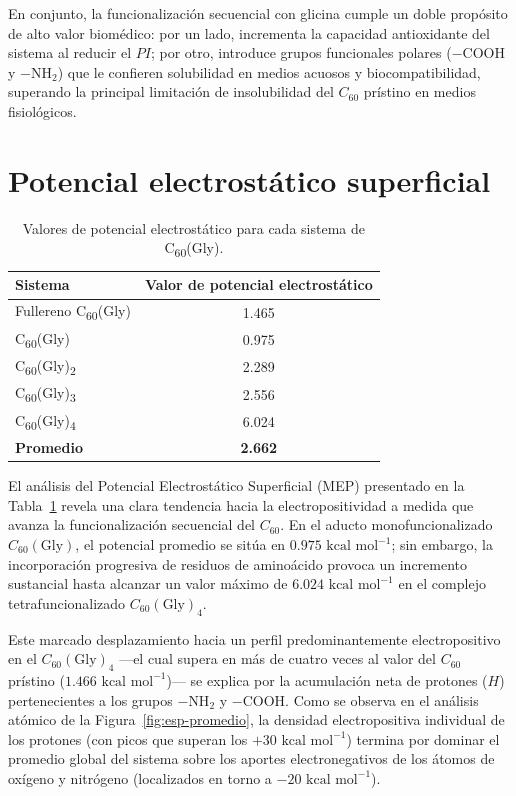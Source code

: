 En conjunto, la funcionalización secuencial con glicina cumple un doble propósito de alto valor biomédico: por un lado, incrementa la capacidad antioxidante del sistema al reducir el $PI$; por otro, introduce grupos funcionales polares ($-\text{COOH}$ y $-\text{NH}_2$) que le confieren solubilidad en medios acuosos y biocompatibilidad, superando la principal limitación de insolubilidad del $C_{60}$ prístino en medios fisiológicos.


    
    \section{Potencial electrostático superficial}
     \begin{table}[H]
    \centering
    \caption{Valores de potencial electrostático para cada sistema de C\textsubscript{60}(Gly).}
    \label{tab:potencial-electrostatico}
    \renewcommand{\arraystretch}{1.15}
    \begin{tabular}{lc}
        \toprule
        \textbf{Sistema} & \textbf{Valor de potencial electrostático} \\
        \midrule
        Fullereno C\textsubscript{60}(Gly) & 1.465 \\
       C\textsubscript{60}(Gly) & 0.975 \\
        C\textsubscript{60}(Gly)\textsubscript{2} & 2.289 \\
        C\textsubscript{60}(Gly)\textsubscript{3} & 2.556 \\
        C\textsubscript{60}(Gly)\textsubscript{4} & 6.024 \\
        \midrule
        \textbf{Promedio} & \textbf{2.662} \\
        \bottomrule
        \end{tabular}
\end{table}

El análisis del Potencial Electrostático Superficial (MEP) presentado en la Tabla~\ref{tab:potencial-electrostatico} revela una clara tendencia hacia la electropositividad a medida que avanza la funcionalización secuencial del $C_{60}$. En el aducto monofuncionalizado $C_{60}(\text{Gly})$, el potencial promedio se sitúa en $0.975\text{ kcal mol}^{-1}$; sin embargo, la incorporación progresiva de residuos de aminoácido provoca un incremento sustancial hasta alcanzar un valor máximo de $6.024\text{ kcal mol}^{-1}$ en el complejo tetrafuncionalizado $C_{60}(\text{Gly})_4$. 

Este marcado desplazamiento hacia un perfil predominantemente electropositivo en el $C_{60}(\text{Gly})_4$ —el cual supera en más de cuatro veces al valor del $C_{60}$ prístino ($1.466\text{ kcal mol}^{-1}$)— se explica por la acumulación neta de protones ($H$) pertenecientes a los grupos $-\text{NH}_2$ y $-\text{COOH}$. Como se observa en el análisis atómico de la Figura~\ref{fig:esp-promedio}, la densidad electropositiva individual de los protones (con picos que superan los $+30\text{ kcal mol}^{-1}$) termina por dominar el promedio global del sistema sobre los aportes electronegativos de los átomos de oxígeno y nitrógeno (localizados en torno a $-20\text{ kcal mol}^{-1}$).

